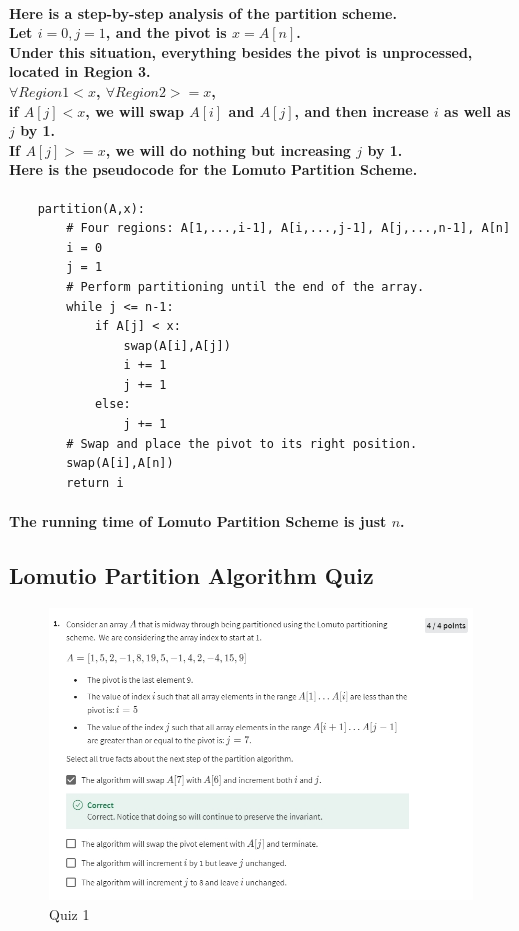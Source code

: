 \documentclass{article}
\begin{document}
\paragraph{Here is a step-by-step analysis of the partition scheme.\\
Let $i=0, j=1$, and the pivot is $x = A[n]$.\\
Under this situation, everything besides the pivot is unprocessed, located in Region 3.\\
$\forall Region1 < x$, $\forall Region2 >= x$,\\
if $A[j] < x$, we will swap $A[i]$ and $A[j]$, and then increase $i$ as well as $j$ by 1.\\
If $A[j] >= x$, we will do nothing but increasing $j$ by 1.\\
Here is the pseudocode for the Lomuto Partition Scheme.\\}

\begin{verbatim}
    partition(A,x):
        # Four regions: A[1,...,i-1], A[i,...,j-1], A[j,...,n-1], A[n]
        i = 0
        j = 1
        # Perform partitioning until the end of the array.
        while j <= n-1:
            if A[j] < x:
                swap(A[i],A[j])
                i += 1
                j += 1
            else:
                j += 1
        # Swap and place the pivot to its right position.
        swap(A[i],A[n])
        return i
\end{verbatim}

\paragraph{The running time of Lomuto Partition Scheme is just $n$.\\}

\subsection{Lomutio Partition Algorithm Quiz}

\begin{figure}[H]
    \includegraphics[width=\textwidth]{week3lomutoquiz1.png}
    \caption{Quiz 1\\}
\end{figure}
\end{document}
